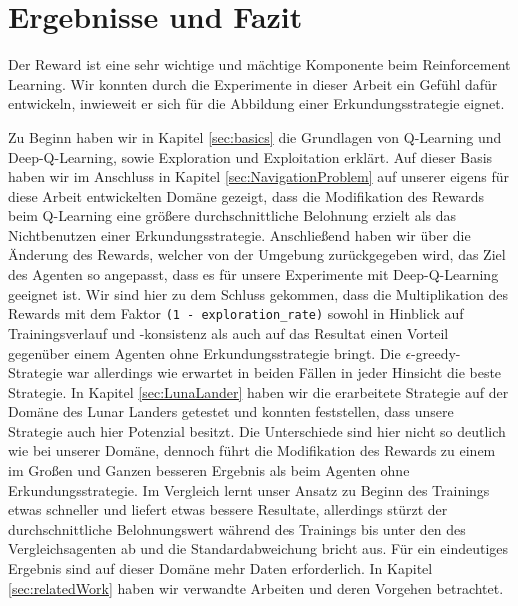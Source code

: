 \chapter{Ergebnisse und Fazit} \label{sec:conclusion}
Der Reward ist eine sehr wichtige und mächtige Komponente beim Reinforcement Learning. Wir konnten durch die Experimente in dieser Arbeit ein Gefühl dafür entwickeln, inwieweit er sich für die Abbildung einer Erkundungsstrategie eignet.

Zu Beginn haben wir in Kapitel \ref{sec:basics} die Grundlagen von Q-Learning und Deep-Q-Learning, sowie Exploration und Exploitation erklärt. Auf dieser Basis haben wir im Anschluss in Kapitel \ref{sec:NavigationProblem} auf unserer eigens für diese Arbeit entwickelten Domäne gezeigt, dass die Modifikation des Rewards beim Q-Learning eine größere durchschnittliche Belohnung erzielt als das Nichtbenutzen einer Erkundungsstrategie. Anschließend haben wir über die Änderung des Rewards, welcher von der Umgebung zurückgegeben wird, das Ziel des Agenten so angepasst, dass es für unsere Experimente mit Deep-Q-Learning geeignet ist. Wir sind hier zu dem Schluss gekommen, dass die Multiplikation des Rewards mit dem Faktor \texttt{(1 - exploration_rate)} sowohl in Hinblick auf Trainingsverlauf und -konsistenz als auch auf das Resultat einen Vorteil gegenüber einem Agenten ohne Erkundungsstrategie bringt. Die $ \epsilon $-greedy-Strategie war allerdings wie erwartet in beiden Fällen in jeder Hinsicht die beste Strategie. In Kapitel \ref{sec:LunaLander} haben wir die erarbeitete Strategie auf der Domäne des Lunar Landers getestet und konnten feststellen, dass unsere Strategie auch hier Potenzial besitzt. Die Unterschiede sind hier nicht so deutlich wie bei unserer Domäne, dennoch führt die Modifikation des Rewards zu einem im Großen und Ganzen besseren Ergebnis als beim Agenten ohne Erkundungsstrategie. Im Vergleich lernt unser Ansatz zu Beginn des Trainings etwas schneller und liefert etwas bessere Resultate, allerdings stürzt der durchschnittliche Belohnungswert während des Trainings bis unter den des Vergleichsagenten ab und die Standardabweichung bricht aus. Für ein eindeutiges Ergebnis sind auf dieser Domäne mehr Daten erforderlich. In Kapitel \ref{sec:relatedWork} haben wir verwandte Arbeiten und deren Vorgehen betrachtet. 

